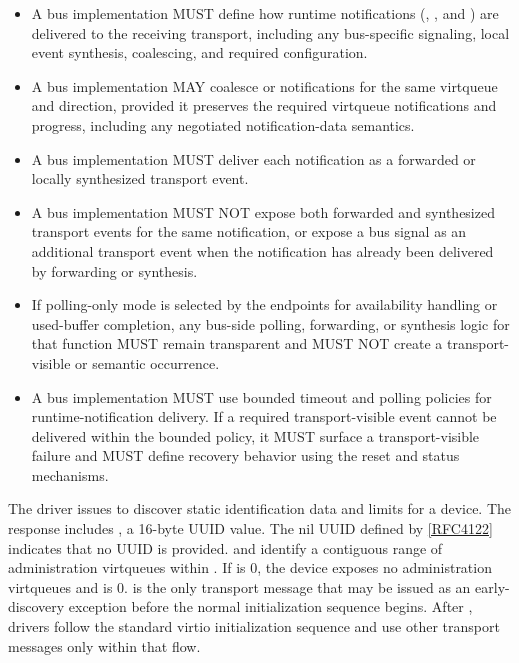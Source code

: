 \begin{itemize}
  \item A bus implementation MUST define how runtime notifications
        (, , and )
        are delivered to the receiving transport, including any bus-specific
        signaling, local event synthesis, coalescing, and required
        configuration.
  \item A bus implementation MAY coalesce  or
         notifications for the same virtqueue and direction,
        provided it preserves the required virtqueue notifications and progress,
        including any negotiated notification-data semantics.
  \item A bus implementation MUST deliver each 
        notification as a forwarded or locally synthesized transport event.
  \item A bus implementation MUST NOT expose both forwarded and synthesized
        transport events for the same notification, or expose a bus signal as
        an additional transport event when the notification has already been
        delivered by forwarding or synthesis.
  \item If polling-only mode is selected by the endpoints for availability
        handling or used-buffer completion, any bus-side polling, forwarding,
        or synthesis logic for that function MUST remain transparent and MUST
        NOT create a transport-visible  or
         semantic occurrence.
  \item A bus implementation MUST use bounded timeout and polling policies for
        runtime-notification delivery. If a required transport-visible event
        cannot be delivered within the bounded policy, it MUST surface a
        transport-visible failure and MUST define recovery behavior using the
        reset and status mechanisms.
\end{itemize}


The driver issues  to discover static identification
data and limits for a device. The response includes , a
16-byte UUID value. The nil UUID defined by
\hyperref[intro:rfc4122]{[RFC4122]} indicates that no UUID is provided.
 and  identify a contiguous range
of administration virtqueues within . If
 is 0, the device exposes no administration virtqueues
and  is 0.
 is the only transport message that may be issued as an
early-discovery exception before the normal initialization sequence begins.
After , drivers follow the standard virtio
initialization sequence and use other transport messages only within that flow.

